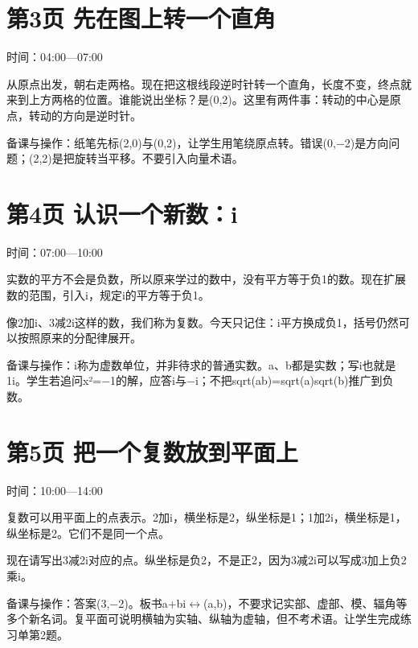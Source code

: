 \documentclass[UTF8,a4paper,11pt,fontset=fandol]{ctexart}
\begin{document}
\par\noindent\begin{minipage}{\linewidth}

\section*{第3页 先在图上转一个直角}

时间：04:00—07:00

从原点出发，朝右走两格。现在把这根线段逆时针转一个直角，长度不变，终点就来到上方两格的位置。谁能说出坐标？是(0,2)。这里有两件事：转动的中心是原点，转动的方向是逆时针。

{\small\color{black!65}备课与操作：纸笔先标(2,0)与(0,2)，让学生用笔绕原点转。错误(0,−2)是方向问题；(2,2)是把旋转当平移。不要引入向量术语。}

\end{minipage}\par\vspace{3mm}

\par\noindent\begin{minipage}{\linewidth}

\section*{第4页 认识一个新数：i}

时间：07:00—10:00

实数的平方不会是负数，所以原来学过的数中，没有平方等于负1的数。现在扩展数的范围，引入i，规定i的平方等于负1。

像2加i、3减2i这样的数，我们称为复数。今天只记住：i平方换成负1，括号仍然可以按照原来的分配律展开。

{\small\color{black!65}备课与操作：i称为虚数单位，并非待求的普通实数。a、b都是实数；写i也就是1i。学生若追问x²=−1的解，应答i与−i；不把sqrt(ab)=sqrt(a)sqrt(b)推广到负数。}

\end{minipage}\par\vspace{3mm}

\par\noindent\begin{minipage}{\linewidth}

\section*{第5页 把一个复数放到平面上}

时间：10:00—14:00

复数可以用平面上的点表示。2加i，横坐标是2，纵坐标是1；1加2i，横坐标是1，纵坐标是2。它们不是同一个点。

现在请写出3减2i对应的点。纵坐标是负2，不是正2，因为3减2i可以写成3加上负2乘i。

{\small\color{black!65}备课与操作：答案(3,−2)。板书a+bi$\leftrightarrow$(a,b)，不要求记实部、虚部、模、辐角等多个新名词。复平面可说明横轴为实轴、纵轴为虚轴，但不考术语。让学生完成练习单第2题。}

\end{minipage}\par\vspace{3mm}
\end{document}
